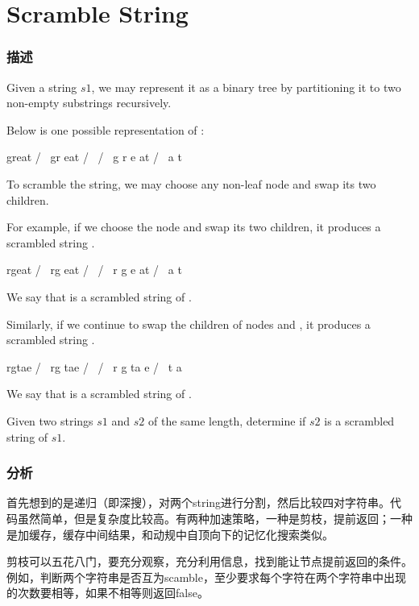 \section{Scramble String} %
\label{sec:scramble-string}


\subsubsection{描述}
Given a string $s1$, we may represent it as a binary tree by partitioning it to two non-empty substrings recursively.

Below is one possible representation of :
\begin{Code}
    great
   /    \
  gr    eat
 / \    /  \
g   r  e   at
           / \
          a   t
\end{Code}

To scramble the string, we may choose any non-leaf node and swap its two children.

For example, if we choose the node  and swap its two children, it produces a scrambled string .
\begin{Code}
    rgeat
   /    \
  rg    eat
 / \    /  \
r   g  e   at
           / \
          a   t
\end{Code}

We say that  is a scrambled string of .

Similarly, if we continue to swap the children of nodes  and , it produces a scrambled string .
\begin{Code}
    rgtae
   /    \
  rg    tae
 / \    /  \
r   g  ta  e
       / \
      t   a
\end{Code}

We say that  is a scrambled string of .

Given two strings $s1$ and $s2$ of the same length, determine if $s2$ is a scrambled string of $s1$.


\subsubsection{分析}
首先想到的是递归（即深搜），对两个string进行分割，然后比较四对字符串。代码虽然简单，但是复杂度比较高。有两种加速策略，一种是剪枝，提前返回；一种是加缓存，缓存中间结果，和动规中自顶向下的记忆化搜索类似。

剪枝可以五花八门，要充分观察，充分利用信息，找到能让节点提前返回的条件。例如，判断两个字符串是否互为scamble，至少要求每个字符在两个字符串中出现的次数要相等，如果不相等则返回false。


